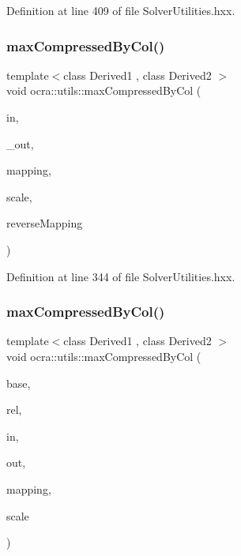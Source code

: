 Definition at line 409 of file Solver\+Utilities.\+hxx.

\hypertarget{namespaceocra_1_1utils_a9de6baf9d21a683ff798695ac099055a}{}\label{namespaceocra_1_1utils_a9de6baf9d21a683ff798695ac099055a} 
\subsubsection{\texorpdfstring{max\+Compressed\+By\+Col()}{maxCompressedByCol()}\hspace{0.1cm}{\footnotesize\ttfamily [1/2]}}
{\footnotesize\ttfamily template$<$class Derived1 , class Derived2 $>$ \\
void ocra\+::utils\+::max\+Compressed\+By\+Col (\begin{DoxyParamCaption}\item[{const Matrix\+Base$<$ Derived1 $>$ \&}]{in,  }\item[{Matrix\+Base$<$ Derived2 $>$ const \&}]{\+\_\+out,  }\item[{const std\+::vector$<$ int $>$ \&}]{mapping,  }\item[{double}]{scale,  }\item[{bool}]{reverse\+Mapping }\end{DoxyParamCaption})\hspace{0.3cm}{\ttfamily [inline]}}



Definition at line 344 of file Solver\+Utilities.\+hxx.

\hypertarget{namespaceocra_1_1utils_a86da8040ccbcb2a583b7e628dc8265ea}{}\label{namespaceocra_1_1utils_a86da8040ccbcb2a583b7e628dc8265ea} 
\subsubsection{\texorpdfstring{max\+Compressed\+By\+Col()}{maxCompressedByCol()}\hspace{0.1cm}{\footnotesize\ttfamily [2/2]}}
{\footnotesize\ttfamily template$<$class Derived1 , class Derived2 $>$ \\
void ocra\+::utils\+::max\+Compressed\+By\+Col (\begin{DoxyParamCaption}\item[{const \hyperlink{classocra_1_1Variable}{Variable} \&}]{base,  }\item[{const \hyperlink{classocra_1_1Variable}{Variable} \&}]{rel,  }\item[{const Matrix\+Base$<$ Derived1 $>$ \&}]{in,  }\item[{Matrix\+Base$<$ Derived2 $>$ const \&}]{out,  }\item[{std\+::vector$<$ int $>$ \&}]{mapping,  }\item[{double}]{scale }\end{DoxyParamCaption})\hspace{0.3cm}{\ttfamily [inline]}}



